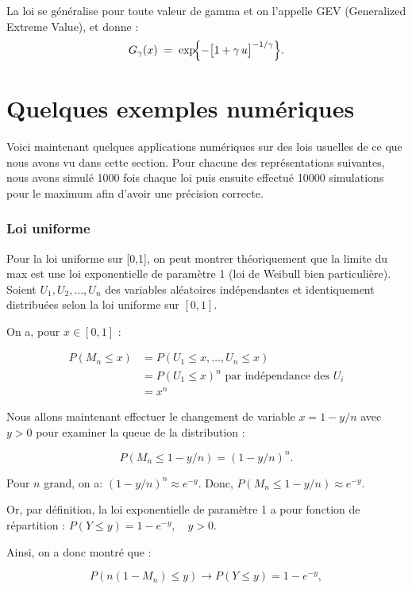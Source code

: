 \documentclass{article}
\theoremstyle{plain}
\theoremstyle{definition}
\theoremstyle{plain}
\begin{document}
La loi se généralise pour toute valeur de gamma et on l'appelle GEV (Generalized Extreme Value), et donne :
\[
	G_{\gamma}(x)
	\;=\;
	\exp\!\Bigl\{-\bigl[1 + \gamma\,u\bigr]^{-1/\gamma}\Bigr\}.
\]


\newpage
\section{Quelques exemples numériques}

\noindent Voici maintenant quelques applications numériques sur des lois usuelles de ce que nous avons vu dans cette section. Pour chacune des représentations suivantes, nous avons simulé 1000 fois chaque loi puis ensuite effectué 10000 simulations pour le maximum afin d'avoir une précision correcte. 

\subsubsection{Loi uniforme}

\noindent Pour la loi uniforme sur [0,1], on peut montrer théoriquement que la limite du max est une loi exponentielle de paramètre 1 (loi de Weibull bien particulière). \\
\noindent Soient \( U_1, U_2, \dots, U_n \) des variables aléatoires indépendantes et identiquement distribuées selon la loi uniforme sur \([0,1]\).

\noindent On a, pour $ x \in [0,1]$ :

\begin{align*}
	P(M_n \leq x) &= P(U_1 \leq x, \dots, U_n \leq x) \\
	&= P(U_1 \leq x)^n \text{ par indépendance des $U_i$}\\
	&= x^n
\end{align*}

\noindent Nous allons maintenant effectuer le changement de variable $ x = 1 - y/n $ avec $y > 0 $ pour examiner la queue de la distribution :

\[
P(M_n \leq 1 - y/n) = (1 - y/n)^n.
\]

\noindent Pour $ n $ grand, on a: $(1 - y/n)^n \approx e^{-y} $. Donc, $ P(M_n \leq 1 - y/n) \approx e^{-y} $.


\noindent Or, par définition, la loi exponentielle de paramètre 1 a pour fonction de répartition : $ P(Y \leq y) = 1 - e^{-y}, \quad y > 0. $

\noindent Ainsi, on a donc montré que :

\[
P(n(1 - M_n) \leq y) \to P(Y \leq y) = 1 - e^{-y},
\]
\end{document}
